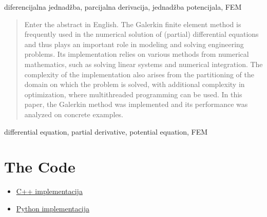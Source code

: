 \documentclass[zavrsnirad]{../fer}
\begin{document}
\begin{kljucnerijeci}
  diferencijalna jednadžba, parcijalna derivacija, jednadžba potencijala, FEM
\end{kljucnerijeci}


\begin{abstract}
	Enter the abstract in English.
The Galerkin finite element method is frequently
used in the numerical solution of (partial) differential
equations and thus plays an important role in modeling
and solving engineering problems.
Its implementation relies on various methods from numerical mathematics,
such as solving linear systems and numerical integration.
The complexity of the implementation also arises from the partitioning
of the domain on which the problem is solved, with additional
complexity in optimization, where multithreaded programming can be used.
In this paper, the Galerkin method was implemented and its
performance was analyzed on concrete examples.
\end{abstract}

\begin{keywords}
  differential equation, partial derivative, potential equation, FEM
\end{keywords}



\backmatter

\chapter{The Code}
\begin{itemize}
 \item \href{https://github.com/hrvojerados/CppFEM-Library}{C++ implementacija}

 \item \href{https://github.com/hrvojerados/FiniteElementMethods}{Python implementacija}
\end{itemize}
\end{document}
